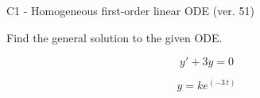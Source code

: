 \begin{exercise}
  \begin{exerciseTitle}C1 - Homogeneous first-order linear ODE (ver. 51)\end{exerciseTitle}
  \begin{exerciseStatement}
    
Find the general solution to the given ODE.

    
\[y'+3y=0\]

  \end{exerciseStatement}
  \begin{exerciseAnswer}
    
\[y= k e^{\left(-3 \, t\right)}\]

  \end{exerciseAnswer}
\end{exercise}